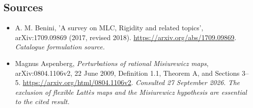 \documentclass[11pt,a4paper]{article}
\numberwithin{equation}{section}
\begin{document}
\subsection{Sources}
\begin{itemize}\raggedright
\item[\textnormal{[S1]}]\hypertarget{source:30006757:1}{} A. M. Benini, 'A survey on MLC, Rigidity and related topics', arXiv:1709.09869 (2017, revised 2018).
\url{https://arxiv.org/abs/1709.09869}.
{\small\textit{Catalogue formulation source.}}
\item[\textnormal{[E1]}]\hypertarget{extra:30006757:1}{} Magnus Aspenberg,
\emph{Perturbations of rational Misiurewicz maps}, arXiv:0804.1106v2,
22 June 2009, Definition 1.1, Theorem A, and Sections 3--5.
\url{https://arxiv.org/html/0804.1106v2}.
{\small\textit{Consulted 27 September 2026. The exclusion of flexible
Latt\`es maps and the Misiurewicz hypothesis are essential to the cited result.}}
\end{itemize}
\end{document}
